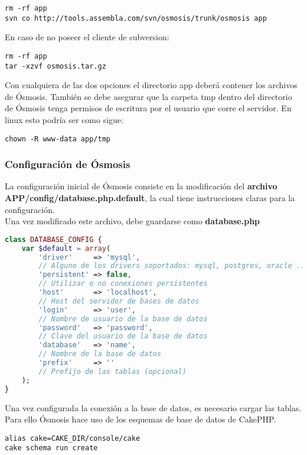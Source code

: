 \begin{lstlisting}
rm -rf app
svn co http://tools.assembla.com/svn/osmosis/trunk/osmosis app
\end{lstlisting}

En caso de no poseer el cliente de subversion:

\begin{lstlisting}
rm -rf app
tar -xzvf osmosis.tar.gz
\end{lstlisting}

Con cualquiera de las dos opciones el directorio app deberá contener los archivos de Ósmosis. También se debe asegurar que la carpeta tmp dentro del directorio de Ósmosis tenga permisos de escritura por el usuario que corre el servidor. En linux esto podría ser como sigue:

\begin{lstlisting}
chown -R www-data app/tmp
\end{lstlisting}

\subsubsection{Configuración de Ósmosis}
La configuración inicial de Ósmosis consiste en la modificación del \textbf{archivo APP/config/database.php.default}, la cual tiene instrucciones claras para la configuración.\\

Una vez modificado este archivo, debe guardarse como \textbf{database.php}
\begin{lstlisting}[language=PHP]
class DATABASE_CONFIG {
	var $default = array(
		'driver'	 => 'mysql',
		// Alguno de los drivers soportados: mysql, postgres, oracle ...
		'persistent' => false,
		// Utilizar o no conexiones persistentes
		'host'		 => 'localhost',
		// Host del servidor de bases de datos
		'login'		 => 'user',
		// Nombre de usuario de la base de datos
		'password'	 => 'password',
		// Clave del usuario de la base de datos
		'database'	 => 'name',
		// Nombre de la base de datos
		'prefix'	 => ''
		// Prefijo de las tablas (opcional)
	);
}
\end{lstlisting}

Una vez configurada la conexión a la base de datos, es necesario cargar las tablas. Para ello Ósmosis hace uso de los esquemas de base de datos de CakePHP.\\

\begin{lstlisting}
alias cake=CAKE_DIR/console/cake
cake schema run create
\end{lstlisting}

